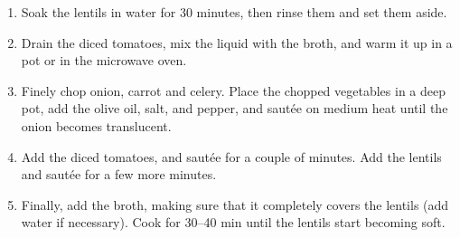 
\begin{ingredients}
\end{ingredients}


\begin{recipe}
  \begin{enumerate}

  \item Soak the lentils in water for 30 minutes, then rinse them and
    set them aside.

  \item Drain the diced tomatoes, mix the liquid with the broth, and
    warm it up in a pot or in the microwave oven.

  \item Finely chop onion, carrot and celery. Place the chopped
    vegetables in a deep pot, add the olive oil, salt, and pepper, and
    saut\'ee on medium heat until the onion becomes translucent.

  \item Add the diced tomatoes, and saut\'ee for a couple of
    minutes. Add the lentils and saut\'ee for a few more minutes.

  \item Finally, add the broth, making sure that it completely covers
    the lentils (add water if necessary). Cook for 30--40 min until
    the lentils start becoming soft.

  \end{enumerate}
\end{recipe}
